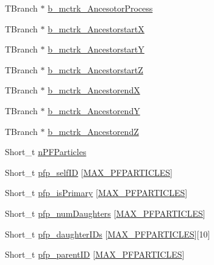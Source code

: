 \begin{DoxyCompactItemize}
\item 
T\-Branch $\ast$ \hyperlink{classanatree_a57271022de8f9780aaaaf7027e4c7b5f}{b\-\_\-mctrk\-\_\-\-Ancesotor\-Process}
\item 
T\-Branch $\ast$ \hyperlink{classanatree_aa1576290bbeadd14ab80189288e5bd19}{b\-\_\-mctrk\-\_\-\-Ancestorstart\-X}
\item 
T\-Branch $\ast$ \hyperlink{classanatree_a731b5b7ecb4f501a04d3fc431f0320f7}{b\-\_\-mctrk\-\_\-\-Ancestorstart\-Y}
\item 
T\-Branch $\ast$ \hyperlink{classanatree_a4ad6231b0306d661f34304b1ec76c6c9}{b\-\_\-mctrk\-\_\-\-Ancestorstart\-Z}
\item 
T\-Branch $\ast$ \hyperlink{classanatree_ac5e379867858a566db66f31f898069d5}{b\-\_\-mctrk\-\_\-\-Ancestorend\-X}
\item 
T\-Branch $\ast$ \hyperlink{classanatree_a0795fc8135b29e8a7e48fc30d1d3ad2e}{b\-\_\-mctrk\-\_\-\-Ancestorend\-Y}
\item 
T\-Branch $\ast$ \hyperlink{classanatree_a4564a08e43ba515f1bcf68b1d3a67017}{b\-\_\-mctrk\-\_\-\-Ancestorend\-Z}
\item 
Short\-\_\-t \hyperlink{classanatree_a84aeab1940e673c8cbeb0b299bce0e47}{n\-P\-F\-Particles}
\item 
Short\-\_\-t \hyperlink{classanatree_af1812e768bf393f650d757dd6cd0975f}{pfp\-\_\-self\-I\-D} \mbox{[}\hyperlink{anatree__core__v09410002_8h_a357d0a9d7f96df271f39dd025e28c52c}{M\-A\-X\-\_\-\-P\-F\-P\-A\-R\-T\-I\-C\-L\-E\-S}\mbox{]}
\item 
Short\-\_\-t \hyperlink{classanatree_a10f093278f20ac266a1ecdda6c7454ab}{pfp\-\_\-is\-Primary} \mbox{[}\hyperlink{anatree__core__v09410002_8h_a357d0a9d7f96df271f39dd025e28c52c}{M\-A\-X\-\_\-\-P\-F\-P\-A\-R\-T\-I\-C\-L\-E\-S}\mbox{]}
\item 
Short\-\_\-t \hyperlink{classanatree_adfb2156accda2718d89c380254f14361}{pfp\-\_\-num\-Daughters} \mbox{[}\hyperlink{anatree__core__v09410002_8h_a357d0a9d7f96df271f39dd025e28c52c}{M\-A\-X\-\_\-\-P\-F\-P\-A\-R\-T\-I\-C\-L\-E\-S}\mbox{]}
\item 
Short\-\_\-t \hyperlink{classanatree_a125193de01cd6100cb3891bfddcd0d06}{pfp\-\_\-daughter\-I\-Ds} \mbox{[}\hyperlink{anatree__core__v09410002_8h_a357d0a9d7f96df271f39dd025e28c52c}{M\-A\-X\-\_\-\-P\-F\-P\-A\-R\-T\-I\-C\-L\-E\-S}\mbox{]}\mbox{[}10\mbox{]}
\item 
Short\-\_\-t \hyperlink{classanatree_a3cfce47851160f31e2dd3e7155997baf}{pfp\-\_\-parent\-I\-D} \mbox{[}\hyperlink{anatree__core__v09410002_8h_a357d0a9d7f96df271f39dd025e28c52c}{M\-A\-X\-\_\-\-P\-F\-P\-A\-R\-T\-I\-C\-L\-E\-S}\mbox{]}

\end{DoxyCompactItemize}
